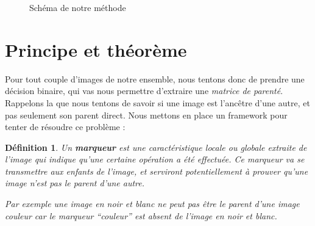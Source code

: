 \documentclass[utf8,final]{stageM2R} %
\begin{document}
\begin{figure}[H]
\begin{center}
{}
    \caption{Schéma de notre méthode}
    \label{fig:method_schema}
  \end{center}
\end{figure}

\section{Principe et théorème}
Pour tout couple d'images de notre ensemble, nous tentons donc de prendre une décision binaire, qui vas nous permettre d'extraire une \textit{matrice de parenté}. Rappelons la que nous tentons de savoir si une image est l'ancêtre d'une autre, et pas seulement son parent direct. Nous mettons en place un framework pour tenter de résoudre ce problème : 

\newtheorem*{marqueur}{Définition}
\begin{marqueur}
  Un \textbf{marqueur} est une caractéristique locale ou globale extraite de l'image qui indique qu'une certaine opération a été effectuée. Ce marqueur va se transmettre aux enfants de l'image, et serviront potentiellement à prouver qu'une image n'est pas le parent d'une autre.

Par exemple une image en noir et blanc ne peut pas être le parent d'une image couleur car le marqueur ``couleur'' est absent de l'image en noir et blanc.
\end{marqueur}
\end{document}
